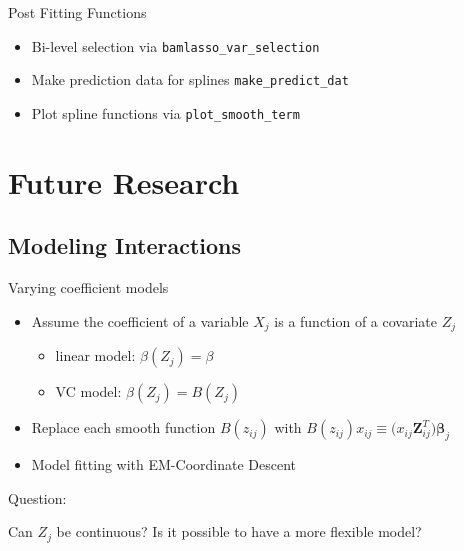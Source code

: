 \documentclass[
  ignorenonframetext,
  aspectratio=169]{beamer}
\providecommand{\tightlist}{%
  \setlength{\itemsep}{0pt}\setlength{\parskip}{0pt}}
\newcommand{\bs}[1]{\boldsymbol{#1}}
\begin{document}
\begin{frame}[fragile]{Post Fitting Functions}
\protect\hypertarget{post-fitting-functions}{}
\begin{itemize}
\tightlist
\item
  Bi-level selection via \texttt{bamlasso\_var\_selection}
\item
  Make prediction data for splines \texttt{make\_predict\_dat}
\item
  Plot spline functions via \texttt{plot\_smooth\_term}
\end{itemize}
\end{frame}

\hypertarget{future-research}{%
\section{Future Research}\label{future-research}}

\hypertarget{modeling-interactions}{%
\subsection{Modeling Interactions}\label{modeling-interactions}}

\begin{frame}{Varying coefficient models}
\protect\hypertarget{varying-coefficient-models}{}
\begin{itemize}
\tightlist
\item
  Assume the coefficient of a variable \(X_j\) is a function of a
  covariate \(Z_j\)

  \begin{itemize}
  \tightlist
  \item
    linear model: \(\beta(Z_j) = \beta\)
  \item
    VC model: \(\beta(Z_j) = B(Z_j)\)
  \end{itemize}
\item
  Replace each smooth function \(B(z_{ij})\) with
  \(B(z_{ij})x_{ij}\equiv \bs (x_{ij}\bs Z_{ij}^T)\bs \beta_j\)
\item
  Model fitting with EM-Coordinate Descent
\end{itemize}

Question:

\begin{tcolorbox}[colback=green!5,colframe=green!40!black,title=Question]
  Can $Z_j$ be continuous? Is it possible to have a more flexible model? 
\end{tcolorbox}
\end{frame}
\end{document}
